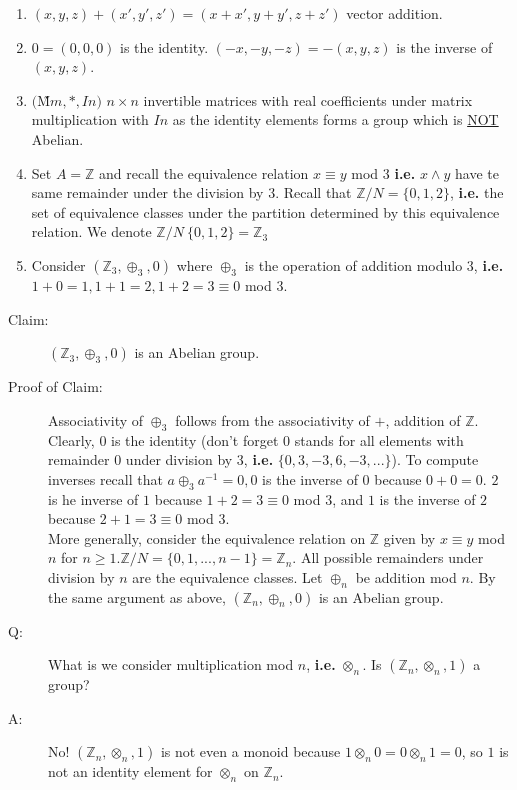 \documentclass[10pt]{article}
\begin{document}
\begin{description}
\begin{enumerate}
			\item[] $(x, y, z)+(x', y', z') = (x+x', y+y', z+z')$ vector addition.
			\item[] $0 = (0, 0, 0)$ is the identity. \hspace{10mm} $(-x, -y, -z) = - (x, y, z)$ is the inverse of $(x, y, z)$.
			\item $($\~{M}$m, *, In)$ $n\times n$ invertible matrices with real coefficients under matrix multiplication with $In$ as the identity elements forms a group which is \underline{NOT} Abelian.
			\item Set $A = \mathbb{Z}$ and recall the equivalence relation $x \equiv y$ mod $3$ \textbf{i.e.} $x \land y$ have te same remainder under the division by $3$. Recall that $\mathbb{Z} / N = \{0, 1, 2\}$, \textbf{i.e.} the set of equivalence classes under the partition determined by this equivalence relation. We denote $\mathbb{Z} / N \ \{0, 1, 2\} = \mathbb{Z}_3$
			\item[] Consider $(\mathbb{Z}_3, \oplus _3, 0)$ where $\oplus _3$ is the operation of addition modulo $3$, \textbf{i.e.} $1+0=1, 1+1=2, 1+2=3 \equiv 0$ mod $3$.
		\end{enumerate}
		\begin{description}
			\item[Claim:] $(\mathbb{Z}_3, \oplus _3, 0)$ is an Abelian group.
			\item[Proof of Claim:] Associativity of $\oplus _3$ follows from the associativity of $+$, addition of $\mathbb{Z}$. Clearly, $0$ is the identity (don't forget $0$ stands for all elements with remainder $0$ under division by $3$, \textbf{i.e.} $\{0, 3, -3, 6, -3, ...\}$). To compute inverses recall that $a \oplus _3 a^{-1} = 0, 0$ is the inverse of $0$ because $0+0=0$. $2$ is he inverse of $1$ because $1+2=3 \equiv 0$ mod $3$, and $1$ is the inverse of $2$ because $2+1=3 \equiv 0$ mod $3$. \\
			More generally, consider the equivalence relation on $\mathbb{Z}$ given by $x \equiv y$ mod $n$ for $n \geq 1. \mathbb{Z} / N = \{0, 1, ..., n-1\} = \mathbb{Z}_n$. All possible remainders under division by $n$ are the equivalence classes. Let $\oplus _n$ be addition mod $n$. By the same argument as above, $(\mathbb{Z}_n, \oplus _n, 0)$ is an Abelian group.
			\item[Q:] What is we consider multiplication mod $n$, \textbf{i.e.} $\otimes _n$. Is $(\mathbb{Z}_n, \otimes _n, 1)$ a group?
			\item[A:] No! $(\mathbb{Z}_n, \otimes _n, 1)$ is not even a monoid because $1 \otimes _n 0 = 0 \otimes _n 1 = 0$, so $1$ is not an identity element for $\otimes _n$ on $\mathbb{Z}_n$.

\end{description}
\end{description}
\end{document}
